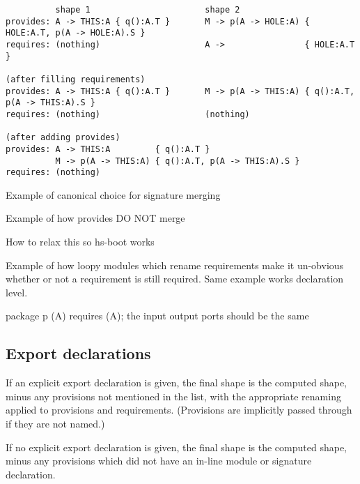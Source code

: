 \documentclass{article}
\newcommand{\Red}[1]{{\color{red} #1}}
\begin{document}
\begin{verbatim}
          shape 1                       shape 2
provides: A -> THIS:A { q():A.T }       M -> p(A -> HOLE:A) { HOLE:A.T, p(A -> HOLE:A).S }
requires: (nothing)                     A ->                { HOLE:A.T }

(after filling requirements)
provides: A -> THIS:A { q():A.T }       M -> p(A -> THIS:A) { q():A.T, p(A -> THIS:A).S }
requires: (nothing)                     (nothing)

(after adding provides)
provides: A -> THIS:A         { q():A.T }
          M -> p(A -> THIS:A) { q():A.T, p(A -> THIS:A).S }
requires: (nothing)
\end{verbatim}

\Red{Example of canonical choice for signature merging}

\Red{Example of how provides DO NOT merge}

\Red{How to relax this so hs-boot works}

\Red{Example of how loopy modules which rename requirements make it un-obvious whether or not
a requirement is still required.  Same example works declaration level.}

\Red{package p (A) requires (A); the input output ports should be the same}

%
%
%

\newpage

\subsection{Export declarations}

If an explicit export declaration is given, the final shape is the
computed shape, minus any provisions not mentioned in the list, with the
appropriate renaming applied to provisions and requirements.  (Provisions
are implicitly passed through if they are not named.)

If no explicit export declaration is given, the final shape is
the computed shape, minus any provisions which did not have an in-line
module or signature declaration.
\end{document}
